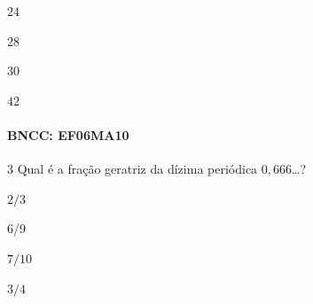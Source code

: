 {\begin{escolha}
\item $24$
\item $28$
\item $30$
\item $42$
\end{escolha}

\paragraph{BNCC: EF06MA10 }


\num{3} Qual é a fração geratriz da dízima periódica $0,666$\ldots?

\begin{escolha}
\item $2/3$
\item $6$/9
\item $7/10$
\item $3/4$
\end{escolha}



}

